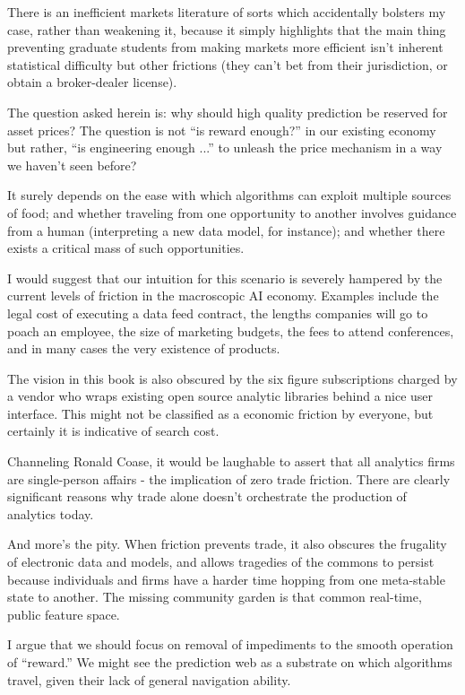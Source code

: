 There is an inefficient markets literature of sorts which accidentally bolsters my case, rather than weakening it, because it simply highlights that the main thing preventing graduate students from making markets more efficient isn't inherent statistical difficulty but other frictions (they can't bet from their jurisdiction, or obtain a broker-dealer license). 


The question asked herein is: why should high quality prediction be reserved for asset prices? The question is not ``is reward enough?'' in our existing economy but rather, ``is engineering enough ...'' to unleash the price mechanism in a way we haven't seen before? 


It surely depends on the ease with which algorithms can exploit multiple sources of food; and whether traveling from one opportunity to another involves guidance from a human (interpreting a new data model, for instance); and whether there exists a critical mass of such opportunities. 


I would suggest that our intuition for this scenario is severely hampered by the current levels of friction in the macroscopic AI economy. Examples include the legal cost of executing a data feed contract, the lengths companies will go to poach an employee, the size of marketing budgets, the fees to attend conferences, and in many cases the very existence of products. 

The vision in this book is also obscured by the six figure subscriptions charged by a vendor who wraps existing open source analytic libraries behind a nice user interface. This might not be classified as a economic friction by everyone, but certainly it is indicative of search cost. 

Channeling Ronald Coase, it would be laughable to assert that all analytics firms are single-person affairs - the implication of zero trade friction. There are clearly significant reasons why trade alone doesn't orchestrate the production of analytics today. 

And more's the pity. When friction prevents trade, it also obscures the frugality of electronic data and models, and allows tragedies of the commons to persist because individuals and firms have a harder time hopping from one meta-stable state to another. The missing community garden is that common real-time, public feature space. 


I argue that we should focus on removal of impediments to the smooth operation of ``reward.'' We might see the prediction web as a substrate on which algorithms travel, given their lack of general navigation ability. 


